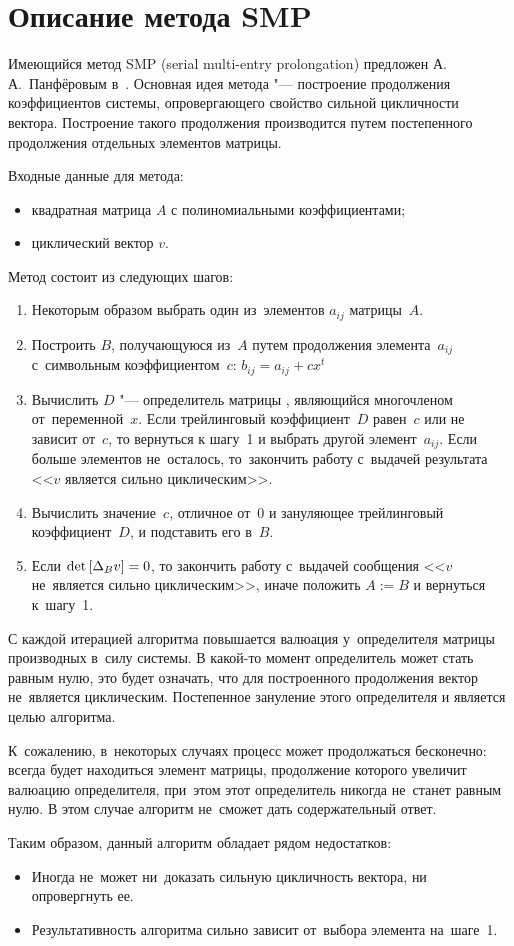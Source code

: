 \section{Описание метода SMP}

Имеющийся метод SMP (serial multi-entry prolongation) предложен А.\,А.~Панфёровым в~\cite{litPanferov}.
Основная идея метода "--- построение продолжения коэффициентов системы,
опровергающего свойство сильной цикличности вектора.
Построение такого продолжения производится путем постепенного продолжения отдельных элементов матрицы.

Входные данные для метода:
\begin{itemize}
    \item
        квадратная матрица $A$ с полиномиальными коэффициентами;
    \item
        циклический вектор $v$.
\end{itemize}

Метод состоит из следующих шагов:
\begin{enumerate}
    \item
        Некоторым образом выбрать один из~элементов $a_{ij}$ матрицы~$A$.
    \item
        Построить $B$, получающуюся из~$A$ путем продолжения элемента~$a_{ij}$ с~символьным коэффициентом~$c$:
        $b_{ij} = a_{ij} + cx^t$
    \item
        Вычислить $D$ "--- определитель матрицы \diffMatrix[B], являющийся многочленом от~переменной~$x$.
        Если трейлинговый коэффициент~$D$ равен~$c$ или не зависит от~$c$, то вернуться к шагу~1 и выбрать другой элемент~$a_{ij}$.
        Если больше элементов не~осталось, то~закончить работу с~выдачей результата <<$v$ является сильно циклическим>>.
    \item
        Вычислить значение~$c$, отличное от~0 и зануляющее трейлинговый коэффициент~$D$, и подставить его в~$B$.
    \item
        Если $\mathop{\rm det}\text{$ [\Delta_B v] $} = 0$, то закончить работу с~выдачей сообщения <<$v$ не~является сильно циклическим>>,
        иначе положить $A := B$ и вернуться к~шагу~1.
\end{enumerate}

С каждой итерацией алгоритма повышается валюация у~определителя матрицы производных в~силу системы.
В какой-то момент определитель может стать равным нулю, это будет означать,
что для построенного продолжения вектор не~является циклическим.
Постепенное зануление этого определителя и является целью алгоритма.

К~сожалению, в~некоторых случаях процесс может продолжаться бесконечно:
всегда будет находиться элемент матрицы, продолжение которого увеличит валюацию определителя,
при~этом этот определитель никогда не~станет равным нулю.
В этом случае алгоритм не~сможет дать содержательный ответ.

Таким образом, данный алгоритм обладает рядом недостатков:
\begin{itemize}
    \item
        Иногда не~может ни~доказать сильную цикличность вектора, ни опровергнуть ее.
    \item
        Результативность алгоритма сильно зависит от~выбора элемента на~шаге~1.
\end{itemize}
